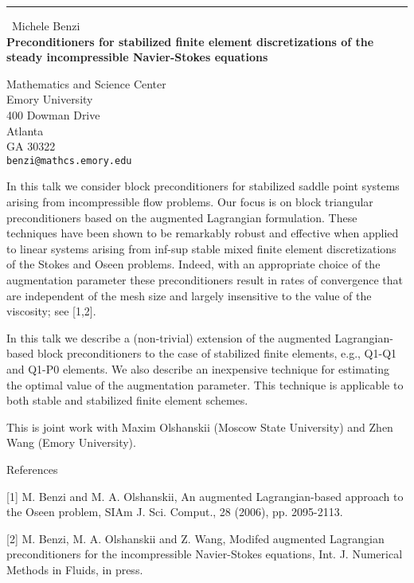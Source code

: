 \documentclass{report}
\begin{document}
\begin{center}
\rule{6in}{1pt} \
{\large Michele Benzi \\
{\bf Preconditioners for stabilized finite element discretizations of the steady incompressible Navier-Stokes equations}}

Mathematics and Science Center \\ Emory University \\ 400 Dowman Drive \\ Atlanta \\ GA 30322
\\
{\tt benzi@mathcs.emory.edu}\end{center}

In this talk we consider block preconditioners for stabilized
saddle point systems arising from incompressible flow problems.
Our focus is on block triangular preconditioners based on the
augmented Lagrangian formulation. These techniques have been
shown to be remarkably robust and effective when applied to
linear systems arising from inf-sup stable mixed finite element
discretizations of the Stokes and Oseen problems. Indeed, with an
appropriate choice of the augmentation parameter these
preconditioners result in rates of convergence that are
independent of the mesh size and largely insensitive to
the value of the viscosity; see [1,2].

In this talk we describe a (non-trivial) extension of the
augmented Lagrangian-based block preconditioners to the
case of stabilized finite elements, e.g., Q1-Q1 and Q1-P0
elements. We also describe an inexpensive technique for
estimating the optimal value of the augmentation parameter.
This technique is applicable to both stable and stabilized
finite element schemes.

This is joint work with Maxim Olshanskii (Moscow State
University) and Zhen Wang (Emory University).

References

[1] M. Benzi and M. A. Olshanskii, An augmented Lagrangian-based
approach to the Oseen problem, SIAm J. Sci. Comput., 28 (2006),
pp. 2095-2113.

[2] M. Benzi, M. A. Olshanskii and Z. Wang, Modifed augmented
Lagrangian preconditioners for the incompressible Navier-Stokes
equations, Int. J. Numerical Methods in Fluids, in press.
\end{document}
